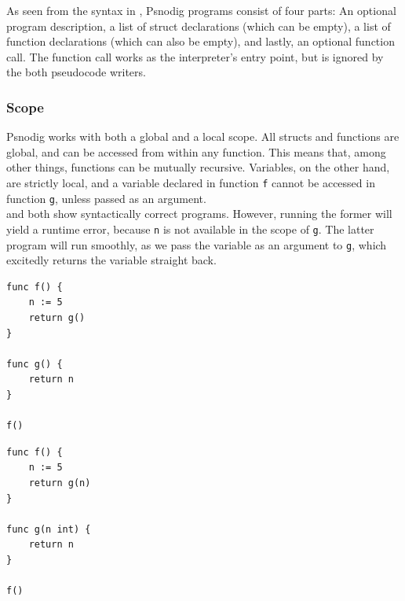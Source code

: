 As seen from the syntax in , Psnodig programs consist of four parts: An optional program description, a list of struct declarations (which can be empty), a list of function declarations (which can also be empty), and lastly, an optional function call. The function call works as the interpreter's entry point, but is ignored by the both pseudocode writers.

\subsubsection{Scope}

Psnodig works with both a global and a local scope. All structs and functions are global, and can be accessed from within any function. This means that, among other things, functions can be mutually recursive. Variables, on the other hand, are strictly local, and a variable declared in function \texttt{f} cannot be accessed in function \texttt{g}, unless passed as an argument. \\

 and  both show syntactically correct programs. However, running the former will yield a runtime error, because \texttt{n} is not available in the scope of \texttt{g}. The latter program will run smoothly, as we pass the variable as an argument to \texttt{g}, which excitedly returns the variable straight back. \\

\begin{minipage}{.45\textwidth}
\begin{lstlisting}[caption={Gourmet program which provokes a runtime error.}, captionpos=b, label={Gourmet program which provokes a runtime error.}]
func f() {
    n := 5
    return g()
}

func g() {
    return n
}

f()
\end{lstlisting}
\end{minipage}\hfill
\begin{minipage}{.45\textwidth}
\begin{lstlisting}[caption={Gourmet program that will run uninterrupted.}, captionpos=b, label={Gourmet code without error.}]
func f() {
    n := 5
    return g(n)
}

func g(n int) {
    return n
}

f()
\end{lstlisting}
\end{minipage}

